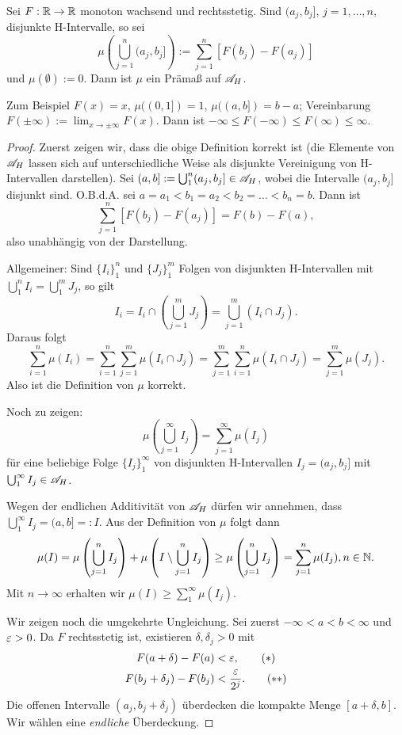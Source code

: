 \begin{lem}
 Sei $F: \mathbb{R} \to \mathbb{R}$ monoton wachsend und rechtsstetig\footnotemark. Sind $(a_j, b_j]$, $j= 1, \ldots, n$, disjunkte H-Intervalle, so sei
 \[ \mu \left( \bigcup_{j=1}^n (a_j, b_j] \right) := \sum_{j=1}^n [ F(b_j) - F(a_j) ] \]
 und $\mu( \emptyset ) := 0$. Dann ist $\mu$ ein Prämaß auf $\mathscr{A}_H$.
\end{lem} 

Zum Beispiel $F(x) = x$, $\mu( (0,1] ) = 1$, $\mu( (a,b] ) = b - a$; Vereinbarung $F( \pm \infty ) := \lim_{x \to \pm \infty} F(x)$. Dann ist $- \infty \le F(-\infty) \le F(\infty) \le \infty$.

\begin{proof}
 Zuerst zeigen wir, dass die obige Definition korrekt ist (die Elemente von $\mathscr{A}_H$ lassen sich auf unterschiedliche Weise als disjunkte Vereinigung von H-Intervallen darstellen). Sei $(a,b] := \bigcup_1^n (a_j, b_j] \in \mathscr{A}_H$, wobei die Intervalle $(a_j, b_j]$ disjunkt sind. O.B.d.A. sei $a = a_1 < b_1 = a_2 < b_2 = \ldots < b_n = b$. Dann ist
 \[ \sum_{j=1}^n [ F( b_j ) - F(a_j) ] = F(b) - F(a), \]
 also unabhängig von der Darstellung. 
 
 Allgemeiner: Sind $\{ I_i \}_1^n$ und $\{ J_j \}_1^m$ Folgen von disjunkten H-Intervallen mit $\bigcup_1^n I_i = \bigcup_1^m J_j$, so gilt
 \[ I_i = I_i \cap \left( \bigcup_{j=1}^m J_j \right) = \bigcup_{j=1}^m ( I_i \cap J_j ). \]
 Daraus folgt
 \[ \sum_{i=1}^n \mu(I_i) = \sum_{i=1}^n \sum_{j=1}^m \mu( I_i \cap J_j ) = \sum_{j=1}^m \sum_{i=1}^n \mu( I_i \cap J_j ) =  \sum_{j=1}^m \mu(J_j). \]
 Also ist die Definition von $\mu$ korrekt.
 
 Noch zu zeigen:
 \[ \mu \left( \bigcup_{j=1}^\infty I_j \right) = \sum_{j=1}^\infty \mu(I_j) \]
 für eine beliebige Folge $\{ I_j \}_1^\infty$ von disjunkten H-Intervallen $I_j = (a_j, b_j]$ mit $\bigcup_1^\infty I_j \in \mathscr{A}_H$. 
 
 Wegen der endlichen Additivität von $\mathscr{A}_H$ dürfen wir annehmen, dass $\bigcup_1^\infty I_j = (a,b] =: I$. Aus der Definition von $\mu$ folgt dann
 \[ \mu(I) = \mu \left( \bigcup_{j=1}^n I_j \right) + \mu \left( I \setminus \bigcup_{j=1}^n I_j \right)
    \ge \mu\left( \bigcup_{j=1}^n I_j \right) = \sum_{j=1}^n \mu( I_j ), n \in \mathbb{N}. \]
 Mit $n \to \infty$ erhalten wir $\mu(I) \ge \sum_1^\infty \mu( I_j )$. 
 
 Wir zeigen noch die umgekehrte Ungleichung. Sei zuerst $- \infty < a < b < \infty $ und $\varepsilon > 0$. Da $F$ rechtsstetig ist, existieren $\delta, \delta_j > 0$ mit 
 \begin{align*}
    F( a + \delta ) - F(a) &< \varepsilon, \tag{$*$} \\
    F(b_j + \delta_j) - F(b_j) &< \frac{\varepsilon}{2^j}. \tag{$**$}
 \end{align*}
 Die offenen Intervalle $(a_j, b_j + \delta_j)$ überdecken die kompakte Menge $[a + \delta, b]$. Wir wählen eine \emph{endliche} Überdeckung.
 

\end{proof}
